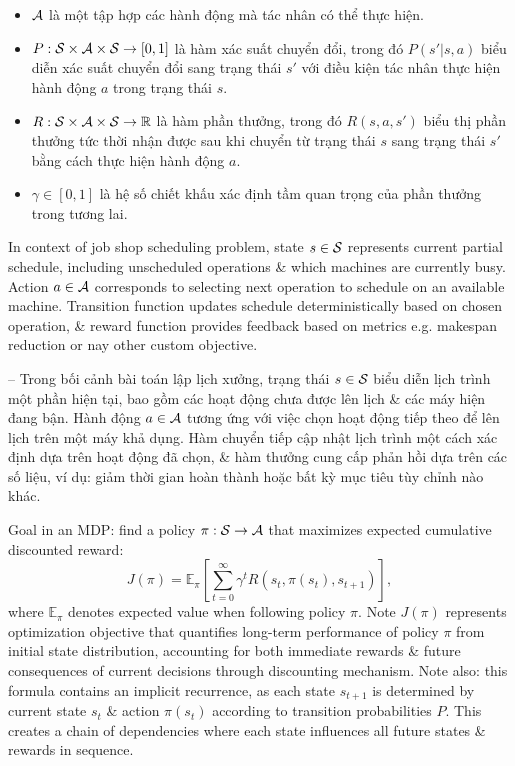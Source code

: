 \documentclass{article}
\begin{document}
\begin{itemize}
\begin{itemize}
\begin{itemize}
            \item ${\cal A}$ là một tập hợp các hành động mà tác nhân có thể thực hiện.
            \item $P:{\cal S}\times{\cal A}\times{\cal S}\to[0,1]$ là hàm xác suất chuyển đổi, trong đó $P(s'|s,a)$ biểu diễn xác suất chuyển đổi sang trạng thái $s'$ với điều kiện tác nhân thực hiện hành động $a$ trong trạng thái $s$.
            \item $R:{\cal S}\times{\cal A}\times{\cal S}\to\mathbb{R}$ là hàm phần thưởng, trong đó $R(s,a,s')$ biểu thị phần thưởng tức thời nhận được sau khi chuyển từ trạng thái $s$ sang trạng thái $s'$ bằng cách thực hiện hành động $a$.
            \item $\gamma\in[0,1]$ là hệ số chiết khấu xác định tầm quan trọng của phần thưởng trong tương lai.
        \end{itemize}
        In context of job shop scheduling problem, state $s\in{\cal S}$ represents current partial schedule, including unscheduled operations \& which machines are currently busy. Action $a\in{\cal A}$ corresponds to selecting next operation to schedule on an available machine. Transition function updates schedule deterministically based on chosen operation, \& reward function provides feedback based on metrics e.g. makespan reduction or nay other custom objective.

        -- Trong bối cảnh bài toán lập lịch xưởng, trạng thái $s\in{\cal S}$ biểu diễn lịch trình một phần hiện tại, bao gồm các hoạt động chưa được lên lịch \& các máy hiện đang bận. Hành động $a\in{\cal A}$ tương ứng với việc chọn hoạt động tiếp theo để lên lịch trên một máy khả dụng. Hàm chuyển tiếp cập nhật lịch trình một cách xác định dựa trên hoạt động đã chọn, \& hàm thưởng cung cấp phản hồi dựa trên các số liệu, ví dụ: giảm thời gian hoàn thành hoặc bất kỳ mục tiêu tùy chỉnh nào khác.

        Goal in an MDP: find a policy $\pi:{\cal S}\to{\cal A}$ that maximizes expected cumulative discounted reward:
        \begin{equation*}
            J(\pi) = \mathbb{E}_\pi\left[\sum_{t=0}^\infty \gamma^tR(s_t,\pi(s_t),s_{t+1})\right],
        \end{equation*}
        where $\mathbb{E}_\pi$ denotes expected value when following policy $\pi$. Note $J(\pi)$ represents optimization objective that quantifies long-term performance of policy $\pi$ from initial state distribution, accounting for both immediate rewards \& future consequences of current decisions through discounting mechanism. Note also: this formula contains an implicit recurrence, as each state $s_{t+1}$ is determined by current state $s_t$ \& action $\pi(s_t)$ according to transition probabilities $P$. This creates a chain of dependencies where each state influences all future states \& rewards in sequence.


\end{itemize}
\end{itemize}
\end{document}
